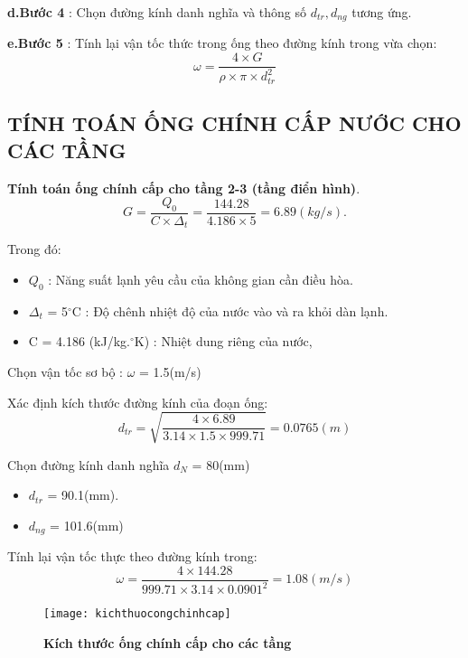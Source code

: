 \textbf{d.Bước 4} : Chọn đường kính danh nghĩa và thông số $d_{tr}, d_{ng}$ tương ứng.

\textbf{e.Bước 5} : Tính lại vận tốc thức trong ống theo đường kính trong vừa chọn:
\begin{equation*}
	\omega = \dfrac{4 \times G}{\rho \times \pi \times d_{tr}^{2}}
\end{equation*} 

\subsection{TÍNH TOÁN ỐNG CHÍNH CẤP NƯỚC CHO CÁC TẦNG}

\textbf{Tính toán ống chính cấp cho tầng 2-3 (tầng điển hình)}.
\begin{equation*}
	G = \dfrac{Q_{0}}{C \times \Delta_{t}} =\dfrac{144.28}{4.186 \times 5} = 6.89(kg/s).
\end{equation*}

\newpage
Trong đó:
\begin{itemize}
	\item $Q_{0}$ : Năng suất lạnh yêu cầu của không gian cần điều hòa.
	\item $\Delta_{t}$ = 5$^{\circ}$C : Độ chênh nhiệt độ của nước vào và ra khỏi dàn lạnh.
	\item C = 4.186 (kJ/kg.$^{\circ}$K) : Nhiệt dung riêng của nước,
\end{itemize}

Chọn vận tốc sơ bộ : $\omega$ = 1.5(m/s)

Xác định kích thước đường kính của đoạn ống:
\begin{equation*}
	d_{tr} = \sqrt{\dfrac{4 \times 6.89}{3.14 \times 1.5 \times 999.71}} = 0.0765(m)
\end{equation*}

Chọn đường kính danh nghĩa $d_{N}$ = 80(mm)
\begin{itemize}
	\item $d_{tr}$ = 90.1(mm).
	\item $d_{ng}$ = 101.6(mm)
\end{itemize}

Tính lại vận tốc thực theo đường kính trong:
\begin{equation*}
	\omega = \dfrac{4 \times 144.28 }{999.71 \times 3.14 \times 0.0901^{2}} = 1.08(m/s)
\end{equation*}

\begin{figure}[H]
 	\centering
 	\texttt{[image: kichthuocongchinhcap]}
 	\caption{\textbf{Kích thước ống chính cấp cho các tầng}}
	\label{kichthuocongchinhcap}	 
\end{figure}

